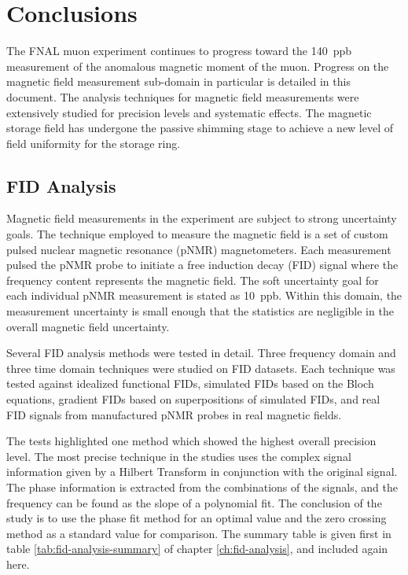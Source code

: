 \chapter{Conclusions}

The FNAL muon \gmtwo experiment continues to progress toward the \SI{140}{ppb} measurement of the anomalous magnetic moment of the muon.  Progress on the magnetic field measurement sub-domain in particular is detailed in this document.  The analysis techniques for magnetic field measurements were extensively studied for precision levels and systematic effects.  The magnetic storage field has undergone the passive shimming stage to achieve a new level of field uniformity for the \gmtwo storage ring.

\section{FID Analysis}

Magnetic field measurements in the \mugmtwo experiment are subject to strong uncertainty goals.  The technique employed to measure the magnetic field is a set of custom pulsed nuclear magnetic resonance (pNMR) magnetometers.  Each measurement pulsed the pNMR probe to initiate a free induction decay (FID) signal where the frequency content represents the magnetic field.  The soft uncertainty goal for each individual pNMR measurement is stated as \SI{10}{ppb}.  Within this domain, the measurement uncertainty is small enough that the statistics are negligible in the overall magnetic field uncertainty.

Several FID analysis methods were tested in detail.  Three frequency domain and three time domain techniques were studied on FID datasets.  Each technique was tested against idealized functional FIDs, simulated FIDs based on the Bloch equations, gradient FIDs based on superpositions of simulated FIDs, and real FID signals from manufactured pNMR probes in real magnetic fields.  

The tests highlighted one method which showed the highest overall precision level.  The most precise technique in the studies uses the complex signal information given by a Hilbert Transform in conjunction with the original signal.  The phase information is extracted from the combinations of the signals, and the frequency can be found as the slope of a polynomial fit.  The conclusion of the study is to use the phase fit method for an optimal value and the zero crossing method as a standard value for comparison.  The summary table is given first in table \ref{tab:fid-analysis-summary} of chapter \ref{ch:fid-analysis}, and included again here.

